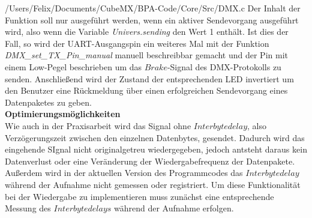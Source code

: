 
{/Users/Felix/Documents/CubeMX/BPA-Code/Core/Src/DMX.c}
Der Inhalt der Funktion soll nur ausgeführt werden, wenn ein aktiver Sendevorgang ausgeführt wird, also wenn die Variable \textit{Univers.sending} den Wert 1 enthält. Ist dies der Fall, so wird der UART-Ausgangspin ein weiteres Mal mit der Funktion \textit{DMX\_set\_TX\_Pin\_manual} manuell beschreibbar gemacht und der Pin mit einem Low-Pegel beschrieben um das $Brake$-Signal des DMX-Protokolls zu senden. Anschließend wird der Zustand der entsprechenden LED invertiert um den Benutzer eine Rückmeldung über einen erfolgreichen Sendevorgang eines Datenpaketes zu geben.\\
\textbf{Optimierungsmöglichkeiten}\\
Wie auch in der Praxisarbeit wird das Signal ohne $Interbytedelay$, also Verzögerungszeit zwischen den einzelnen Datenbytes, gesendet. Dadurch wird das eingehende SIgnal nicht originalgetreu wiedergegeben, jedoch antsteht daraus kein Datenverlust oder eine Veränderung der Wiedergabefrequenz der Datenpakete. Außerdem wird in der aktuellen Version des Programmcodes das $Interbytedelay$ während der Aufnahme nicht gemessen oder registriert. Um diese Funktionalität bei der Wiedergabe zu implementieren muss zunächst eine entsprechende Messung des $Interbytedelays$ während der Aufnahme erfolgen.